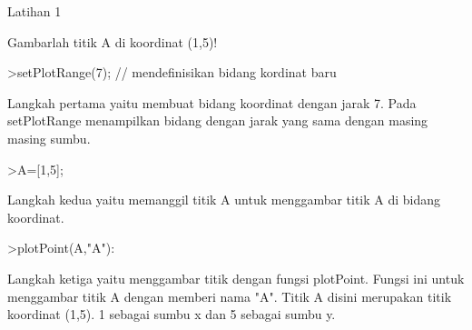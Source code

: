 \documentclass[a4paper,10pt]{article}
\begin{document}
\begin{eulernotebook}
\begin{eulercomment}
\begin{eulercomment}
\begin{eulercomment}
Latihan 1\\
\end{eulercomment}
\eulersubheading{}
\begin{eulercomment}
Gambarlah titik A di koordinat (1,5)!
\end{eulercomment}
\begin{eulerprompt}
>setPlotRange(7); // mendefinisikan bidang kordinat baru
\end{eulerprompt}
\begin{eulercomment}
Langkah pertama yaitu membuat bidang koordinat dengan jarak 7. Pada
setPlotRange menampilkan bidang dengan jarak yang sama dengan masing
masing sumbu.
\end{eulercomment}
\begin{eulerprompt}
>A=[1,5];
\end{eulerprompt}
\begin{eulercomment}
Langkah kedua yaitu memanggil titik A untuk menggambar titik A di
bidang koordinat.
\end{eulercomment}
\begin{eulerprompt}
>plotPoint(A,"A"):
\end{eulerprompt}
\begin{eulercomment}
Langkah ketiga yaitu menggambar titik dengan fungsi plotPoint. Fungsi
ini untuk menggambar titik A dengan memberi nama "A". Titik A disini
merupakan titik koordinat (1,5). 1 sebagai sumbu x dan 5 sebagai sumbu
y.


\end{eulercomment}
\end{eulercomment}
\end{eulercomment}
\end{eulernotebook}
\end{document}
